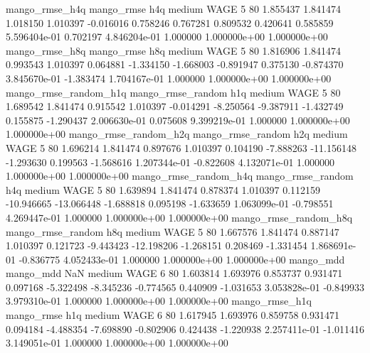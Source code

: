       mango_rmse_h4q        mango_rmse                  h4q     medium     WAGE                 5 80  1.855437       1.841474 1.018150       1.010397   -0.016016      0.758246      0.767281     0.809532       0.420641  0.585859 5.596404e-01     0.702197   4.846204e-01            1.000000    1.000000e+00        1.000000e+00
       mango_rmse_h8q        mango_rmse                  h8q     medium     WAGE                 5 80  1.816906       1.841474 0.993543       1.010397    0.064881     -1.334150     -1.668003    -0.891947       0.375130 -0.874370 3.845670e-01    -1.383474   1.704167e-01            1.000000    1.000000e+00        1.000000e+00
mango_rmse_random_h1q mango_rmse_random                  h1q     medium     WAGE                 5 80  1.689542       1.841474 0.915542       1.010397   -0.014291     -8.250564     -9.387911    -1.432749       0.155875 -1.290437 2.006630e-01     0.075608   9.399219e-01            1.000000    1.000000e+00        1.000000e+00
mango_rmse_random_h2q mango_rmse_random                  h2q     medium     WAGE                 5 80  1.696214       1.841474 0.897676       1.010397    0.104190     -7.888263    -11.156148    -1.293630       0.199563 -1.568616 1.207344e-01    -0.822608   4.132071e-01            1.000000    1.000000e+00        1.000000e+00
mango_rmse_random_h4q mango_rmse_random                  h4q     medium     WAGE                 5 80  1.639894       1.841474 0.878374       1.010397    0.112159    -10.946665    -13.066448    -1.688818       0.095198 -1.633659 1.063099e-01    -0.798551   4.269447e-01            1.000000    1.000000e+00        1.000000e+00
mango_rmse_random_h8q mango_rmse_random                  h8q     medium     WAGE                 5 80  1.667576       1.841474 0.887147       1.010397    0.121723     -9.443423    -12.198206    -1.268151       0.208469 -1.331454 1.868691e-01    -0.836775   4.052433e-01            1.000000    1.000000e+00        1.000000e+00
            mango_mdd         mango_mdd                  NaN     medium     WAGE                 6 80  1.603814       1.693976 0.853737       0.931471    0.097168     -5.322498     -8.345236    -0.774565       0.440909 -1.031653 3.053828e-01    -0.849933   3.979310e-01            1.000000    1.000000e+00        1.000000e+00
       mango_rmse_h1q        mango_rmse                  h1q     medium     WAGE                 6 80  1.617945       1.693976 0.859758       0.931471    0.094184     -4.488354     -7.698890    -0.802906       0.424438 -1.220938 2.257411e-01    -1.011416   3.149051e-01            1.000000    1.000000e+00        1.000000e+00
